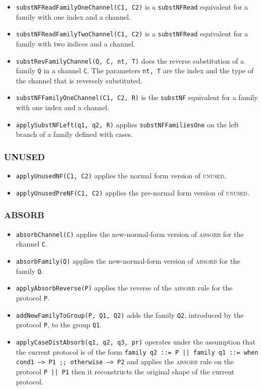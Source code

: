 \begin{itemize}
   \item  \texttt{substNFReadFamilyOneChannel(C1, C2)} is a \texttt{substNFRead} equivalent for a family with one index and a channel.
   \item  \texttt{substNFReadFamilyTwoChannel(C1, C2)} is a \texttt{substNFRead} equivalent for a  family with two indices and a channel.
   \item  \texttt{substRevFamilyChannel(Q, C, nt, T)} does the reverse substitution of a family \texttt{Q} in a channel \texttt{C}. The parameters \texttt{nt, T} are the index and the type of the channel that is reversely substituted.
   \item  \texttt{substNFFamilyOneChannel(C1, C2, R)} is the \texttt{substNF} equivalent for a family with one index and a channel.
   \item  \texttt{applySubstNFLeft(q1, q2, R)} applies \texttt{substNFFamiliesOne} on the left branch of a family defined with cases.
\end{itemize}  

\subsubsection{UNUSED}

\begin{itemize}
\item \texttt{applyUnusedNF(C1, C2)} applies the normal form version of \textsc{unused}.
\item \texttt{applyUnusedPreNF(C1, C2)} applies the pre-normal form
version of \textsc{unused}.
\end{itemize}

\subsubsection{ABSORB}

\begin{itemize}
\item \texttt{absorbChannel(C)} applies the new-normal-form version of
\textsc{absorb} for the channel \texttt{C}.
\item \texttt{absorbFamily(Q)} applies the new-normal-form version
of \textsc{absorb} for the family \texttt{Q}.
\item \texttt{applyAbsorbReverse(P)} applies the reverse of the 
\textsc{absorb} rule for the protocol \texttt{P}.
\item \texttt{addNewFamilyToGroup(P, Q1, Q2)} adds the family \texttt{Q2},
introduced by the protocol \texttt{P}, to the group \texttt{Q1}.
\item \texttt{applyCaseDistAbsorb(q1, q2, q3, pr)} operates
under the assumption that the current protocol is of the form
\texttt{family q2 ::= P || family q1 ::= when cond1 --> P1 ;; otherwise --> P2} and applies the \textsc{absorb} rule on the protocol
\texttt{P || P1} then it reconstructs the original shape of the
current protocol.
\end{itemize}

